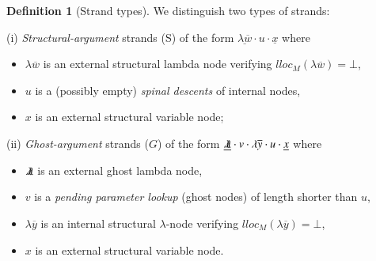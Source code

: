 \documentclass{elsarticle}
\theoremstyle{plain}
\theoremstyle{definition}
\newtheorem{definition}{Definition}[section]
\newcommand{\ghostlmd}{{\lambda\mkern-7mu \lambda}}
\begin{document}
\begin{definition}[Strand types]
    \label{def:strandtypes}
    We distinguish two types of strands:

      \noindent (i) \emph{Structural-argument} strands (S) of the form $\underline{\lambda\overline{w}} \cdot u \cdot \underline{x}$
            where
            \begin{itemize}[nosep]
            \item $\lambda\overline{w}$ is an external structural lambda node verifying $lloc_M(\lambda\overline{w}) = \bot$,
            \item $u$ is a (possibly empty) \emph{spinal descents} of internal nodes,
            \item $x$ is an external structural variable node;
            \end{itemize}

        \item
        (ii) \emph{Ghost-argument} strands ($G$) of the form $\underline{\ghostlmd} \cdot  v \cdot \lambda\overline{y} \cdot u \cdot \underline{x}$
        where
        \begin{itemize}[nosep]
            \item $\ghostlmd$ is an external ghost lambda node,
            \item $v$ is a \emph{pending parameter lookup} (ghost nodes) of length shorter than $u$,
            \item $\lambda\overline{y}$ is an internal structural $\lambda$-node verifying $lloc_M(\lambda\overline{y}) = \bot$,
            \item $x$ is an external structural variable node.
        \end{itemize}
\end{definition}
\end{document}
